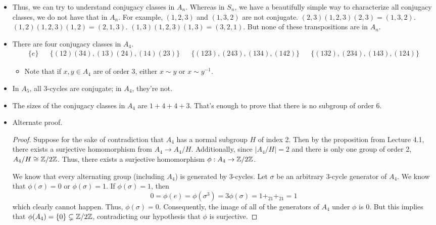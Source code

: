 \documentclass[../notes.tex]{subfiles}
\begin{document}
\begin{itemize}
\begin{itemize}
        \item Thus, we can try to understand conjugacy classes in $A_n$. Whereas in $S_n$, we have a beautifully simple way to characterize all conjugacy classes, we do not have that in $A_n$. For example, $(1,2,3)$ and $(1,3,2)$ are not conjugate. $(2,3)(1,2,3)(2,3)=(1,3,2)$. $(1,2)(1,2,3)(1,2)=(2,1,3)$. $(1,3)(1,2,3)(1,3)=(3,2,1)$. But none of these transpositions are in $A_n$.
        \item There are four conjugacy classes in $A_4$.
        \begin{align*}
            \{e\}&&
            \{(12)(34),(13)(24),(14)(23)\}&&
            \{(123),(243),(134),(142)\}&&
            \{(132),(234),(143),(124)\}
        \end{align*}
        \begin{itemize}
            \item Note that if $x,y\in A_4$ are of order 3, either $x\sim y$ or $x\sim y^{-1}$.
        \end{itemize}
        \item In $A_5$, all 3-cycles are conjugate; in $A_4$, they're not.
        \item The sizes of the conjugacy classes in $A_4$ are $1+4+4+3$. That's enough to prove that there is no subgroup of order 6.
        \item Alternate proof.
        \begin{proof}
            Suppose for the sake of contradiction that $A_4$ has a normal subgroup $H$ of index 2. Then by the proposition from Lecture 4.1, there exists a surjective homomorphism from $A_4\to A_4/H$. Additionally, since $|A_4/H|=2$ and there is only one group of order 2, $A_4/H\cong\mathbb{Z}/2\mathbb{Z}$. Thus, there exists a surjective homomorphism $\phi:A_4\to\mathbb{Z}/2\mathbb{Z}$.\par
            We know that every alternating group (including $A_4$) is generated by 3-cycles. Let $\sigma$ be an arbitrary 3-cycle generator of $A_4$. We know that $\phi(\sigma)=0$ or $\phi(\sigma)=1$. If $\phi(\sigma)=1$, then
            \begin{equation*}
                0 = \phi(e) = \phi(\sigma^3) = 3\phi(\sigma) = 1+_21+_21 = 1
            \end{equation*}
            which clearly cannot happen. Thus, $\phi(\sigma)=0$. Consequently, the image of all of the generators of $A_4$ under $\phi$ is 0. But this implies that $\phi(A_4)=\{0\}\subsetneq\mathbb{Z}/2\mathbb{Z}$, contradicting our hypothesis that $\phi$ is surjective.
        \end{proof}

\end{itemize}
\end{itemize}
\end{document}
